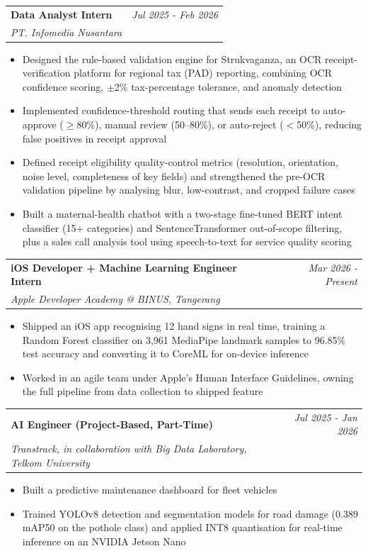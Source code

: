 \documentclass[a4paper,11pt]{article}
\makeatletter
\newcommand{\resumeSubheading}[4]{
\vspace{0.5mm}\item
    \begin{tabular*}{0.98\textwidth}[t]{l@{\extracolsep{\fill}}r}
        \textbf{#1} & \textit{\footnotesize{#4}} \\
        \textit{\footnotesize{#3}} &  \footnotesize{#2}\\
    \end{tabular*}
    \vspace{-2.4mm}
}
\newcommand{\resumeItemListStart}{\begin{justify}\begin{itemize}[leftmargin=3ex, rightmargin=2ex, noitemsep,labelsep=1.2mm,itemsep=0mm]\small}
\newcommand{\resumeItemListEnd}{\end{itemize}\end{justify}\vspace{-2mm}}
\makeatother
\begin{document}
    \resumeSubheading
      {Data Analyst Intern}{}
      {PT. Infomedia Nusantara}{Jul 2025 - Feb 2026}
      \vspace{-2.0mm}
      \resumeItemListStart
        \item {Designed the rule-based validation engine for Strukvaganza, an OCR receipt-verification platform for regional tax (PAD) reporting, combining OCR confidence scoring, $\pm$2\% tax-percentage tolerance, and anomaly detection}
        \item {Implemented confidence-threshold routing that sends each receipt to auto-approve ($\geq$80\%), manual review (50--80\%), or auto-reject ($<$50\%), reducing false positives in receipt approval}
        \item {Defined receipt eligibility quality-control metrics (resolution, orientation, noise level, completeness of key fields) and strengthened the pre-OCR validation pipeline by analysing blur, low-contrast, and cropped failure cases}
        \item {Built a maternal-health chatbot with a two-stage fine-tuned BERT intent classifier (15+ categories) and SentenceTransformer out-of-scope filtering, plus a sales call analysis tool using speech-to-text for service quality scoring}
      \resumeItemListEnd
      \vspace{-3.0mm}

    \resumeSubheading
      {iOS Developer + Machine Learning Engineer Intern}{}
      {Apple Developer Academy @ BINUS, Tangerang}{Mar 2026 - Present}
      \vspace{-2.0mm}
      \resumeItemListStart
        \item {Shipped an iOS app recognising 12 hand signs in real time, training a Random Forest classifier on 3,961 MediaPipe landmark samples to 96.85\% test accuracy and converting it to CoreML for on-device inference}
        \item {Worked in an agile team under Apple's Human Interface Guidelines, owning the full pipeline from data collection to shipped feature}
      \resumeItemListEnd
      \vspace{-3.0mm}

    \resumeSubheading
      {AI Engineer (Project-Based, Part-Time)}{}
      {Transtrack, in collaboration with Big Data Laboratory, Telkom University}{Jul 2025 - Jan 2026}
      \vspace{-2.0mm}
      \resumeItemListStart
        \item {Built a predictive maintenance dashboard for fleet vehicles}
        \item {Trained YOLOv8 detection and segmentation models for road damage (0.389 mAP50 on the pothole class) and applied INT8 quantisation for real-time inference on an NVIDIA Jetson Nano}
      \resumeItemListEnd
      \vspace{-3.0mm}
\end{document}
